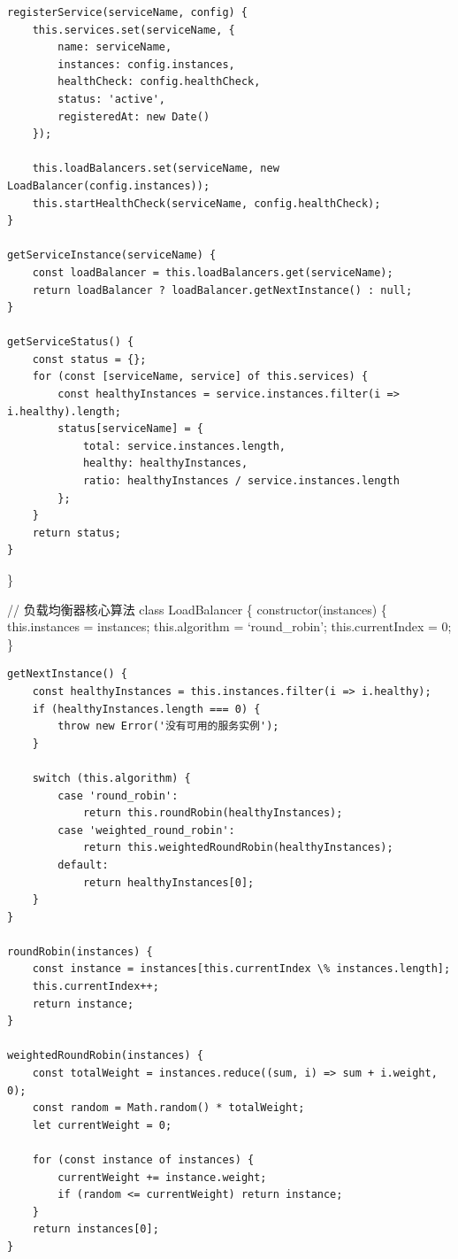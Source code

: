 \begin{verbatim}
registerService(serviceName, config) {
    this.services.set(serviceName, {
        name: serviceName,
        instances: config.instances,
        healthCheck: config.healthCheck,
        status: 'active',
        registeredAt: new Date()
    });
    
    this.loadBalancers.set(serviceName, new LoadBalancer(config.instances));
    this.startHealthCheck(serviceName, config.healthCheck);
}

getServiceInstance(serviceName) {
    const loadBalancer = this.loadBalancers.get(serviceName);
    return loadBalancer ? loadBalancer.getNextInstance() : null;
}

getServiceStatus() {
    const status = {};
    for (const [serviceName, service] of this.services) {
        const healthyInstances = service.instances.filter(i => i.healthy).length;
        status[serviceName] = {
            total: service.instances.length,
            healthy: healthyInstances,
            ratio: healthyInstances / service.instances.length
        };
    }
    return status;
}
\end{verbatim}

\}

// 负载均衡器核心算法 class LoadBalancer \{ constructor(instances) \{ this.instances = instances; this.algorithm = `round\_robin'; this.currentIndex = 0; \}

\begin{verbatim}
getNextInstance() {
    const healthyInstances = this.instances.filter(i => i.healthy);
    if (healthyInstances.length === 0) {
        throw new Error('没有可用的服务实例');
    }
    
    switch (this.algorithm) {
        case 'round_robin':
            return this.roundRobin(healthyInstances);
        case 'weighted_round_robin':
            return this.weightedRoundRobin(healthyInstances);
        default:
            return healthyInstances[0];
    }
}

roundRobin(instances) {
    const instance = instances[this.currentIndex \% instances.length];
    this.currentIndex++;
    return instance;
}

weightedRoundRobin(instances) {
    const totalWeight = instances.reduce((sum, i) => sum + i.weight, 0);
    const random = Math.random() * totalWeight;
    let currentWeight = 0;
    
    for (const instance of instances) {
        currentWeight += instance.weight;
        if (random <= currentWeight) return instance;
    }
    return instances[0];
}
\end{verbatim}

